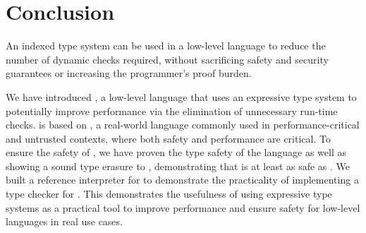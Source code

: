 \chapter{Conclusion}
\label{chp:conclusion}
An indexed type system can be used in a low-level language to reduce the number of dynamic checks required, without sacrificing safety and security guarantees or increasing the programmer's proof burden.

We have introduced \name, a low-level language that uses an expressive type system to potentially improve performance via the elimination of unnecessary run-time checks.
\name is based on \wasm, a real-world language commonly used in performance-critical and untrusted contexts, where both safety and performance are critical.
To ensure the safety of \name, we have proven the type safety of the \name language as well as showing a sound type erasure to \wasm, demonstrating that \name is at least as safe as \wasm.
We built a reference interpreter for \name to demonstrate the practicality of implementing a type checker for \name.
This demonstrates the usefulness of using expressive type systems as a practical tool to improve performance and ensure safety for low-level languages in real use cases.
